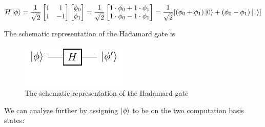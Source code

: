 \begin{equation}
    H\ket{\phi}=\frac{1}{\sqrt{2}}\begin{bmatrix}
        1 & 1\\
        1 & -1\\
    \end{bmatrix}
    \begin{bmatrix}
        \phi_0\\
        \phi_1
    \end{bmatrix}
    =\frac{1}{\sqrt{2}}
    \begin{bmatrix}
        1\cdot\phi_0+1\cdot\phi_1\\
        1\cdot\phi_0-1\cdot\phi_1\\
    \end{bmatrix}
    =\frac{1}{\sqrt{2}}[
        (\phi_0+\phi_1)\ket{0}+
        (\phi_0-\phi_1)\ket{1}
    ]
\end{equation}

The schematic representation of the Hadamard gate is

\begin{figure}[ht]
    \centering
    \includegraphics{images/3_Quantum_Computing/hadamard_gate.pdf}
    \caption{The schematic representation of the Hadamard gate}
\end{figure}

We can analyze further by assigning $\ket{\phi}$ to be on the two computation basis states:

